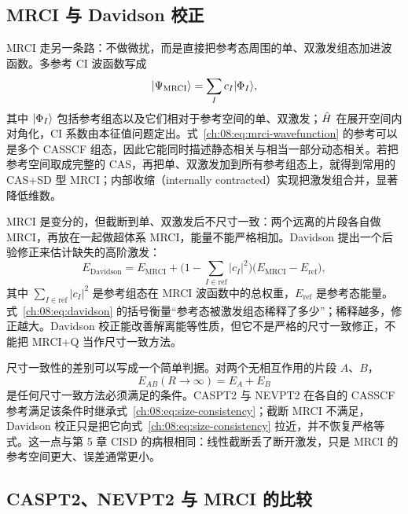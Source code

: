 \subsection{MRCI 与 Davidson 校正}
\label{ch:08:sec:mrci}

MRCI 走另一条路：不做微扰，而是直接把参考态周围的单、双激发组态加进波函数\citep{werner1988,knowles1988,lischka2018mr}。多参考 CI 波函数写成
\begin{equation}
\lvert \Psi_{\mathrm{MRCI}}\rangle
=\sum_{I} c_I\lvert \Phi_I\rangle,
\label{ch:08:eq:mrci-wavefunction}
\end{equation}
其中 $\lvert \Phi_I\rangle$ 包括参考组态以及它们相对于参考空间的单、双激发；$\hat{H}$ 在展开空间内对角化，CI 系数由本征值问题定出。式~\eqref{ch:08:eq:mrci-wavefunction} 的参考可以是多个 CASSCF 组态，因此它能同时描述静态相关与相当一部分动态相关。若把参考空间取成完整的 CAS，再把单、双激发加到所有参考组态上，就得到常用的 CAS+SD 型 MRCI；内部收缩（internally contracted）实现把激发组合并，显著降低维数。

MRCI 是变分的，但截断到单、双激发后不尺寸一致：两个远离的片段各自做 MRCI，再放在一起做超体系 MRCI，能量不能严格相加。Davidson 提出一个后验修正来估计缺失的高阶激发\citep{langhoff1974}：
\begin{equation}
E_{\mathrm{Davidson}}
=E_{\mathrm{MRCI}}
+\Big(1-\sum_{I\in\mathrm{ref}}|c_I|^2\Big)
 \big(E_{\mathrm{MRCI}}-E_{\mathrm{ref}}\big),
\label{ch:08:eq:davidson}
\end{equation}
其中 $\sum_{I\in\mathrm{ref}}|c_I|^2$ 是参考组态在 MRCI 波函数中的总权重，$E_{\mathrm{ref}}$ 是参考态能量。式~\eqref{ch:08:eq:davidson} 的括号衡量“参考态被激发组态稀释了多少”；稀释越多，修正越大。Davidson 校正能改善解离能等性质，但它不是严格的尺寸一致修正，不能把 MRCI+Q 当作尺寸一致方法。

尺寸一致性的差别可以写成一个简单判据。对两个无相互作用的片段 $A$、$B$，
\begin{equation}
E_{AB}(R\to\infty)=E_A+E_B
\label{ch:08:eq:size-consistency}
\end{equation}
是任何尺寸一致方法必须满足的条件。CASPT2 与 NEVPT2 在各自的 CASSCF 参考满足该条件时继承式~\eqref{ch:08:eq:size-consistency}；截断 MRCI 不满足，Davidson 校正只是把它向式~\eqref{ch:08:eq:size-consistency} 拉近，并不恢复严格等式。这一点与第 5 章 CISD 的病根相同：线性截断丢了断开激发，只是 MRCI 的参考空间更大、误差通常更小。

\subsection{CASPT2、NEVPT2 与 MRCI 的比较}
\label{ch:08:sec:compare}

